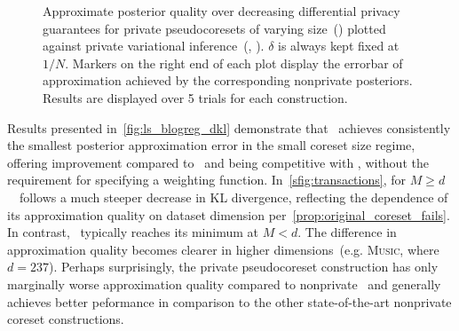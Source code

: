 \begin{figure*}[!t]
	\captionsetup[subfigure]{justification=centering}
	\centering
	\begin{subfigure}[b]{.29\textwidth}
		\vspace*{-0.26cm}
		\centerline{}%
		\label{sfig:santapriv}
	\end{subfigure}
	\hfill\qquad
	\centering
	\begin{subfigure}[b]{.29\textwidth} 
		\vspace*{-0.26cm}
		\centerline{}%
		\label{sfig:chemreact100priv}
	\end{subfigure}
	\hfill\qquad
	\centering
	\begin{subfigure}[b]{.29\textwidth}
		\vspace*{-0.26cm}
		\centerline{}%
		\label{sfig:musicpriv}
	\end{subfigure}
	\hfill\qquad
	\caption{Approximate posterior quality over decreasing differential privacy guarantees for private pseudocoresets of varying size~(\dpsvi) plotted against private variational inference~(\dpvi, \citep{jalko17}). $\delta$ is always kept fixed at $ 1/N$. Markers on the right end of each plot display the errorbar of approximation achieved by the corresponding nonprivate posteriors. Results are displayed over 5 trials for each construction.}
	\label{fig:dklvseps} 
\end{figure*}

Results presented in~\cref{fig:ls_blogreg_dkl} demonstrate that \psvi~achieves consistently the smallest posterior approximation error in the small coreset size regime, offering improvement
compared to \sparsevi~and being competitive with \gigao,
without the requirement for specifying a weighting function. In~\cref{sfig:transactions}, for $M \geq d$ ~\gigao~follows a much steeper decrease in KL divergence, reflecting the dependence of its approximation quality on dataset dimension per~\cref{prop:original_coreset_fails}. In contrast, \psvi~typically reaches its minimum at $M<d$. The difference in approximation quality becomes clearer in higher dimensions~(e.g. \textsc{Music}, where $d=237$). Perhaps surprisingly, the private pseudocoreset construction has only marginally worse approximation quality compared to nonprivate \psvi~and generally achieves better peformance in comparison to the other state-of-the-art nonprivate coreset constructions. 

